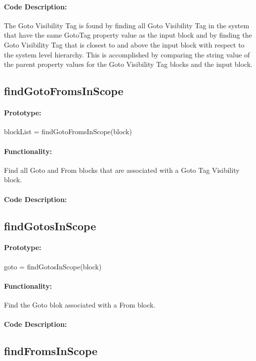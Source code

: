 \documentclass[12pt,letterpaper]{report}
\begin{document}
\paragraph{Code Description:} The Goto Visibility Tag is found by finding all Goto Visibility Tag in the system that have the same GotoTag property value as the input block and by finding the Goto Visibility Tag that is closest to and above the input block with respect to the system level hierarchy. This is accomplished by comparing the string value of the parent property values for the Goto Visibility Tag blocks and the input block.

\subsection{findGotoFromsInScope}
\paragraph{Prototype:} blockList = findGotoFromsInScope(block)
\paragraph{Functionality:} Find all Goto and From blocks that are associated with a Goto Tag Visibility block.
\paragraph{Code Description:} 

\subsection{findGotosInScope}
\paragraph{Prototype:} goto = findGotosInScope(block)
\paragraph{Functionality:} Find the Goto blok associated with a From block.
\paragraph{Code Description:}

\subsection{findFromsInScope}
\end{document}
